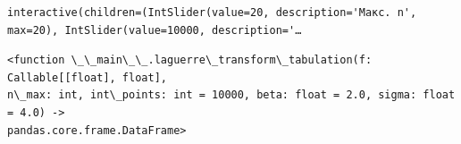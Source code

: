 \documentclass[11pt]{article}
\makeatletter
\newcommand{\boxspacing}{\kern\kvtcb@left@rule\kern\kvtcb@boxsep}
\newcommand{\prompt}[4]{
        {\ttfamily\llap{{\color{#2}[#3]:\hspace{3pt}#4}}\vspace{-\baselineskip}}
    }
\makeatother
\begin{document}
    
    \begin{Verbatim}[commandchars=\\\{\}]
interactive(children=(IntSlider(value=20, description='Макс. n', max=20), IntSlider(value=10000, description='…
    \end{Verbatim}

    
            \begin{tcolorbox}[breakable, size=fbox, boxrule=.5pt, pad at break*=1mm, opacityfill=0]
\prompt{Out}{outcolor}{10}{\boxspacing}
\begin{Verbatim}[commandchars=\\\{\}]
<function \_\_main\_\_.laguerre\_transform\_tabulation(f: Callable[[float], float],
n\_max: int, int\_points: int = 10000, beta: float = 2.0, sigma: float = 4.0) ->
pandas.core.frame.DataFrame>
\end{Verbatim}
\end{tcolorbox}
        
\end{document}
